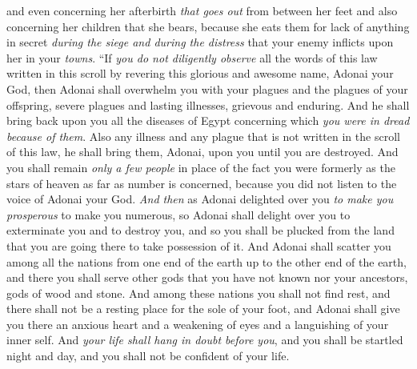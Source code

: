 \begin{biblechapter}
\verse and even concerning her afterbirth \textit{that goes out} from between her feet and also concerning her children that she bears, because she eats them for lack of anything in secret \textit{during the siege and during the distress} that your enemy inflicts upon her in your \textit{towns}.
\verse “If \textit{you do not diligently observe} all the words of this law written in this scroll by revering this glorious and awesome name, Adonai your God,
\verse then Adonai shall overwhelm you with your plagues and the plagues of your offspring, severe plagues and lasting illnesses, grievous and enduring.
\verse And he shall bring back upon you all the diseases of Egypt concerning which \textit{you were in dread} \textit{because of them}.
\verse Also any illness and any plague that is not written in the scroll of this law, he shall bring them, Adonai, upon you until you are destroyed.
\verse And you shall remain \textit{only a few people} in place of the fact you were formerly as the stars of heaven as far as number is concerned, because you did not listen to the voice of Adonai your God.
\verse \textit{And then} as Adonai delighted over you \textit{to make you prosperous} to make you numerous, so Adonai shall delight over you to exterminate you and to destroy you, and so you shall be plucked from the land that you are going there to take possession of it.
\verse And Adonai shall scatter you among all the nations from one end of the earth up to the other end of the earth, and there you shall serve other gods that you have not known nor your ancestors, gods of wood and stone.
\verse And among these nations you shall not find rest, and there shall not be a resting place for the sole of your foot, and Adonai shall give you there an anxious heart and a weakening of eyes and a languishing of your inner self.
\verse And \textit{your life shall hang in doubt before you}, and you shall be startled night and day, and you shall not be confident of your life.

\end{biblechapter}
